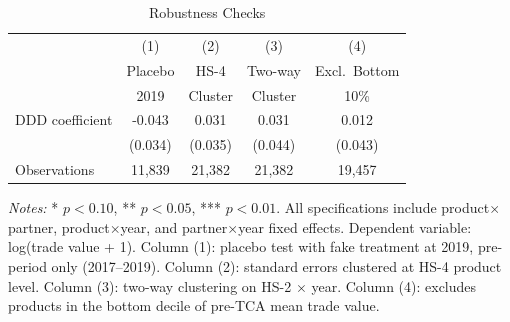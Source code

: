 \begin{table}[H]
\centering
\caption{Robustness Checks}
\label{tab:robust}
\begin{threeparttable}
\begin{tabular}{lcccc}
\toprule
 & (1) & (2) & (3) & (4) \\
 & Placebo & HS-4 & Two-way & Excl.\ Bottom \\
 & 2019 & Cluster & Cluster & 10\% \\
\midrule
DDD coefficient & -0.043 & 0.031 & 0.031 & 0.012 \\
 & (0.034) & (0.035) & (0.044) & (0.043) \\
\midrule
Observations & 11,839 & 21,382 & 21,382 & 19,457 \\
\bottomrule
\end{tabular}
\begin{tablenotes}[flushleft]
\small
\item \textit{Notes:} * $p<0.10$, ** $p<0.05$, *** $p<0.01$. All specifications include product$\times$partner, product$\times$year, and partner$\times$year fixed effects. Dependent variable: log(trade value + 1). Column (1): placebo test with fake treatment at 2019, pre-period only (2017--2019). Column (2): standard errors clustered at HS-4 product level. Column (3): two-way clustering on HS-2 $\times$ year. Column (4): excludes products in the bottom decile of pre-TCA mean trade value.
\end{tablenotes}
\end{threeparttable}
\end{table}
